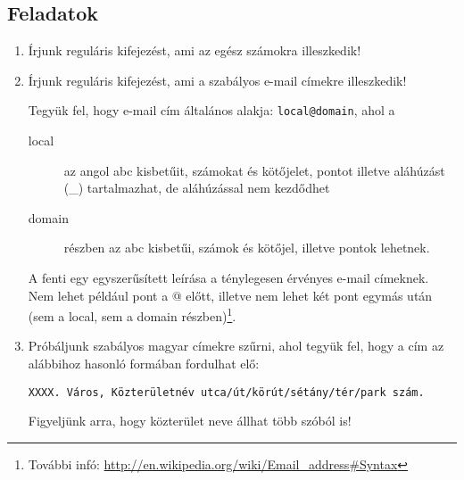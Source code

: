 \subsection*{Feladatok}
\begin{enumerate}
\item Írjunk reguláris kifejezést, ami az egész számokra illeszkedik!
	

\item Írjunk reguláris kifejezést, ami a szabályos e-mail címekre illeszkedik!

	Tegyük fel, hogy e-mail cím általános alakja: \texttt{local@domain}, ahol a 	
	\begin{description}
	\item[local] az angol abc kisbetűit, számokat és kötőjelet, pontot illetve aláhúzást (\_) tartalmazhat, de a\-lá\-hú\-zás\-sal nem kezdődhet
	\item[domain] részben az abc kisbetűi, számok és kötőjel, illetve pontok lehetnek. 
	\end{description}

	A fenti egy egyszerűsített leírása a ténylegesen érvényes e-mail címeknek. 
	Nem lehet például pont a @ előtt, illetve nem lehet két pont egymás után (sem a local, sem a domain részben)\footnote{További infó: \url{http://en.wikipedia.org/wiki/Email\_address\#Syntax}}.

\item Próbáljunk szabályos magyar címekre szűrni, ahol tegyük fel, hogy a cím az alábbihoz hasonló formában fordulhat elő:

	\texttt{XXXX. Város, Közterületnév utca/út/körút/sétány/tér/park szám.}

	Figyeljünk arra, hogy közterület neve állhat több szóból is!
	
\end{enumerate}
